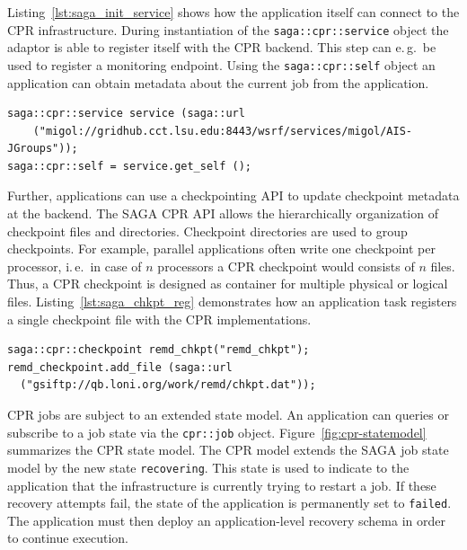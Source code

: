 \documentclass[times, 10pt,twocolumn]{article}
\begin{document}
Listing~\ref{lst:saga_init_service} shows how the application itself can connect to the CPR infrastructure. During instantiation of the \texttt{saga::cpr::service} object the adaptor is able to register itself with the CPR backend. This step can e.\,g.\ be used to register a monitoring endpoint. Using the \texttt{saga::cpr::self} object an application can obtain metadata about the current job from the application.                                                                               
\begin{lstlisting}[style=myListing, caption={SAGA CPR: Initialize Migol Session}, float=t, label={lst:saga_init_service}]
saga::cpr::service service (saga::url 
    ("migol://gridhub.cct.lsu.edu:8443/wsrf/services/migol/AIS-JGroups"));
saga::cpr::self = service.get_self ();
\end{lstlisting}

Further, applications can use a checkpointing API to update checkpoint metadata at the backend. The SAGA CPR API allows the hierarchically 
organization of checkpoint files and directories. Checkpoint directories are 
used to group checkpoints. For example, parallel applications often write one checkpoint per 
processor, i.\,e.\ in case of $n$ processors a CPR checkpoint
would consists of $n$ files. Thus, a CPR checkpoint is designed as container 
for multiple physical or logical files. Listing~\ref{lst:saga_chkpt_reg} demonstrates 
how an application task registers a single checkpoint file with the CPR implementations.     
\begin{lstlisting}[style=myListing, caption={SAGA CPR: Register Checkpoint with Migol}, float=t, label={lst:saga_chkpt_reg}]
saga::cpr::checkpoint remd_chkpt("remd_chkpt");
remd_checkpoint.add_file (saga::url 
  ("gsiftp://qb.loni.org/work/remd/chkpt.dat"));
\end{lstlisting}


CPR jobs are subject to an extended state model. An application can queries or subscribe to a job state via the \texttt{cpr::job} object.      
Figure~\ref{fig:cpr-statemodel} summarizes the CPR state model. The CPR model extends the SAGA job state model by the new state \texttt{recovering}. This state
is used to indicate to the application that the infrastructure is currently trying to restart a job. 
If these recovery attempts fail, the state of the application is permanently set to \texttt{failed}. 
The application must then deploy an application-level recovery schema in order to continue execution. 
\end{document}
